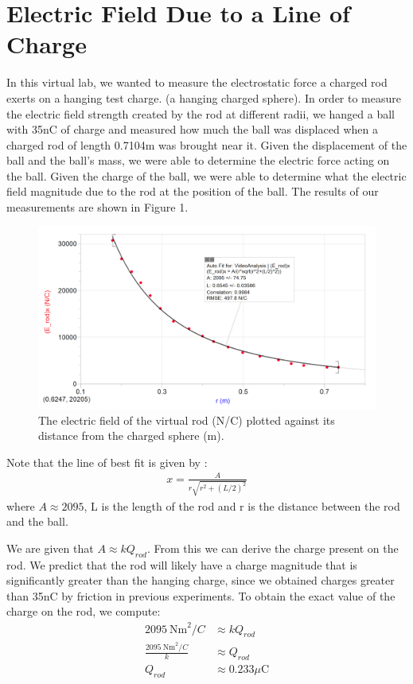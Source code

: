 \documentclass[oneside,12pt]{amsart}
\begin{document}
	\section{Electric Field Due to a Line of Charge}
	\indent In this virtual lab, we wanted to measure the electrostatic force a charged rod exerts on a hanging test charge. (a hanging charged sphere). In order to measure the electric field strength created by the rod at different radii, we hanged a ball with 35nC of charge and measured how much the ball was displaced when a charged rod of length 0.7104m was brought near it. Given the displacement of the ball and the ball's mass, we were able to determine the electric force acting on the ball. Given the charge of the ball, we were able to determine what the electric field magnitude due to the rod at the position of the ball. The results of our measurements are shown in Figure 1.\\
	
	\begin{figure}[h]
		\includegraphics[width=\medgraph,scale=0.01]{FieldStrength.png}
		\caption{The electric field of the virtual rod (N/C) plotted against its distance from the charged sphere (m). 
		}
		\label{Fld}
	\end{figure}
	
	\indent Note that the line of best fit is given by :
	\begin{align*}
	x=\frac{A}{r\sqrt{r^2+(L/2)^2}	}
	\end{align*}
	where $A\approx 2095$, L is the length of the rod and r is the distance between the rod and the ball.
	
	\indent We are given that $A\approx kQ_{rod}$. From this we can derive the charge present on the rod. We predict that the rod will likely have a charge magnitude that is significantly greater than the hanging charge, since we obtained charges greater than 35nC by friction in previous experiments. To obtain the exact value of the charge on the rod, we compute:\\
	\begin{align*}
	2095\:\text{Nm}^2/C &\approx kQ_{rod}\\
	\frac{2095\:\text{Nm}^2/C}{k}&\approx Q_{rod}\\
	Q_{rod}&\approx 0.233\mu\text{C}
	\end{align*}
	
\end{document}
